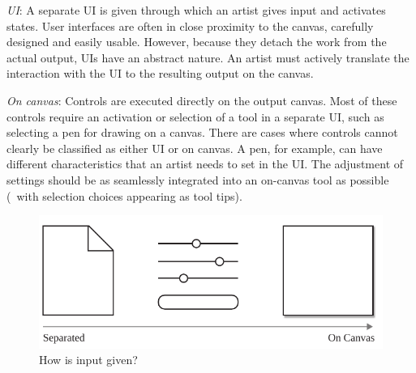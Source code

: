 \textit{UI}: A separate UI is given through which an artist gives input and activates states. User interfaces are often in close proximity to the canvas, carefully designed and easily usable. However, because they detach the work from the actual output, UIs have an abstract nature. An artist must actively translate the interaction with the UI to the resulting output on the canvas.

\textit{On canvas}: Controls are executed directly on the output canvas. Most of these controls require an activation or selection of a tool in a separate UI, such as selecting a pen for drawing on a canvas. 
There are cases where controls cannot clearly be classified as either UI or on canvas. A pen, for example, can have different characteristics that an artist needs to set in the UI. The adjustment of settings should be as seamlessly integrated into an on-canvas tool as possible (\eg~with selection choices appearing as tool tips). 

\begin{figure}[hbt]
    \centering
        \includegraphics[width=\controlParamsFigWidth\linewidth]{figures/control_paradigms/how.pdf}
    \caption{How is input given?}
\end{figure}




